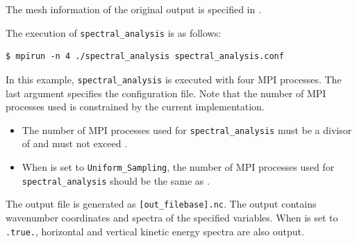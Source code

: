 The mesh information of the original output is specified in
.



The execution of \verb|spectral_analysis| is as follows:
\begin{verbatim}
$ mpirun -n 4 ./spectral_analysis spectral_analysis.conf
\end{verbatim}
In this example, \verb|spectral_analysis| is executed with four MPI processes. 
The last argument specifies the configuration file.
Note that the number of MPI processes used is constrained by the current implementation.
\begin{itemize}
    \item The number of MPI processes used for \verb|spectral_analysis| must be a divisor of  and must not exceed .
    \item When  is set to \verb|Uniform_Sampling|, the number of MPI processes used for \verb|spectral_analysis| should be the same as .
\end{itemize}


The output file is generated as \verb|[out_filebase].nc|.
The output contains wavenumber coordinates and spectra of the specified
variables. When  is set to \verb|.true.|,
horizontal and vertical kinetic energy spectra are also output.
